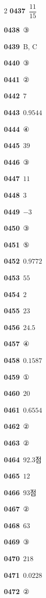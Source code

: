 \documentclass[10pt,a4paper]{article}
\begin{document}
\begin{multicols}{2}
\noindent\textbf{0437}\ $\dfrac{11}{15}$\par
\noindent\textbf{0438}\ ③\par
\noindent\textbf{0439}\ B, C\par
\noindent\textbf{0440}\ ③\par
\noindent\textbf{0441}\ ②\par
\noindent\textbf{0442}\ $7$\par
\noindent\textbf{0443}\ $0.9544$\par
\noindent\textbf{0444}\ ④\par
\noindent\textbf{0445}\ $39$\par
\noindent\textbf{0446}\ ③\par
\noindent\textbf{0447}\ $11$\par
\noindent\textbf{0448}\ $3$\par
\noindent\textbf{0449}\ $-3$\par
\noindent\textbf{0450}\ ③\par
\noindent\textbf{0451}\ ⑤\par
\noindent\textbf{0452}\ $0.9772$\par
\noindent\textbf{0453}\ $55$\par
\noindent\textbf{0454}\ $2$\par
\noindent\textbf{0455}\ $23$\par
\noindent\textbf{0456}\ $24.5$\par
\noindent\textbf{0457}\ ④\par
\noindent\textbf{0458}\ $0.1587$\par
\noindent\textbf{0459}\ ①\par
\noindent\textbf{0460}\ $20$\par
\noindent\textbf{0461}\ $0.6554$\par
\noindent\textbf{0462}\ ②\par
\noindent\textbf{0463}\ ②\par
\noindent\textbf{0464}\ $92.3$점\par
\noindent\textbf{0465}\ $12$\par
\noindent\textbf{0466}\ $93$점\par
\noindent\textbf{0467}\ ②\par
\noindent\textbf{0468}\ $63$\par
\noindent\textbf{0469}\ ③\par
\noindent\textbf{0470}\ $218$\par
\noindent\textbf{0471}\ $0.0228$\par
\noindent\textbf{0472}\ ②\par

\end{multicols}
\end{document}
